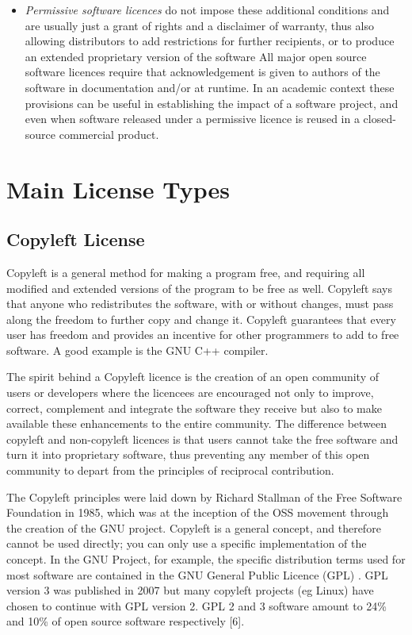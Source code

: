 \documentclass[12pt,a4paper]{article}
\begin{document}
\begin{itemize}
\item \textit{Permissive software licences} do not impose these additional conditions and are usually just a grant of rights and a disclaimer of warranty, thus also allowing distributors to add restrictions for further recipients, or to produce an extended proprietary version of the software
All major open source software licences require that acknowledgement is given to authors of the software in documentation and/or at runtime. In an academic context these provisions can be useful in establishing the impact of a software project, and even when software released under a permissive licence is reused in a closed-source commercial product. 

\end{itemize}

\section{Main License Types}
\label{sec:MainLicenseTypes}

\subsection{Copyleft License}
\label{sec:CopyleftLicense}

Copyleft is a general method for making a program free, and requiring all modified and extended versions of the program to be free as well. Copyleft says that anyone who redistributes the software, with or without changes, must pass along the freedom to further copy and change it. Copyleft guarantees that every user has freedom and provides an incentive for other programmers to add to free software. A good example is the GNU C++ compiler.

The spirit behind a Copyleft licence is the creation of an open community of users or developers where the licencees are encouraged not only to improve, correct, complement and integrate the software they receive but also to make available these enhancements to the entire community. The difference between copyleft and non-copyleft licences is that users cannot take the free software and turn it into proprietary software, thus preventing any member of this open community to depart from the principles of reciprocal contribution. 

The Copyleft principles were laid down by Richard Stallman of the Free Software Foundation in 1985, which was at the inception of the OSS movement through the creation of the GNU project. Copyleft is a general concept, and therefore cannot be used directly; you can only use a specific implementation of the concept. In the GNU Project, for example, the specific distribution terms used for most software are contained in the GNU General Public Licence (GPL) \cite{[4]}. GPL version 3 was published in 2007 but many copyleft projects (eg Linux) have chosen to continue with GPL version 2.
GPL 2 and 3 software amount to 24\% and 10\% of open source software respectively [6].
\end{document}

